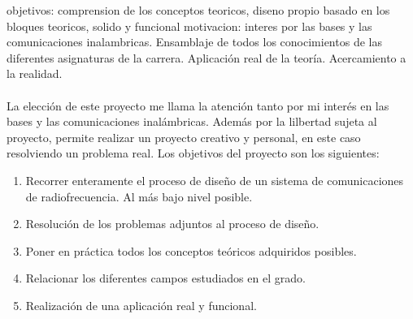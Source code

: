 objetivos: comprension de los conceptos teoricos, diseno propio basado en los bloques teoricos, solido y funcional 
motivacion: interes por las bases y las comunicaciones inalambricas.
Ensamblaje de todos los conocimientos de las diferentes asignaturas de la carrera.
Aplicación real de la teoría. Acercamiento a la realidad.

\paragraph{}
La elección de este proyecto me llama la atención tanto por mi interés en las bases y las comunicaciones inalámbricas. 
Además por la lilbertad sujeta al proyecto, permite realizar un proyecto creativo y personal, en este caso resolviendo un problema real.
Los objetivos del proyecto son los siguientes:
\begin{enumerate}
\item Recorrer enteramente el proceso de diseño de un sistema de comunicaciones de radiofrecuencia. Al más bajo nivel posible.
\item Resolución de los problemas adjuntos al proceso de diseño.
\item Poner en práctica todos los conceptos teóricos adquiridos posibles.
\item Relacionar los diferentes campos estudiados en el grado.
\item Realización de una aplicaci\'on real y funcional.
\end{enumerate}
